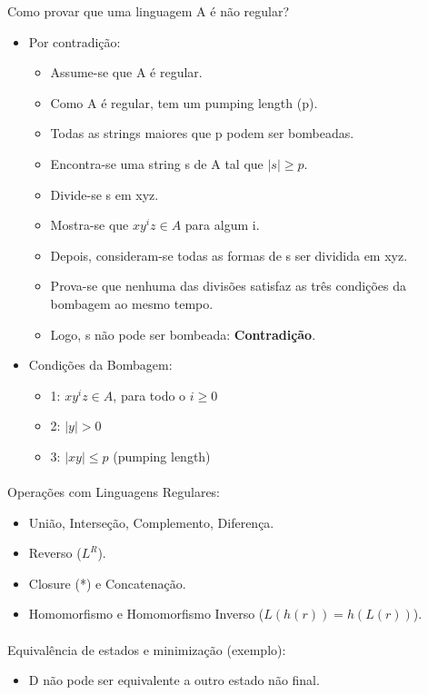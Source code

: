 \documentclass[../resumosTCOM.tex]{subfiles}
\begin{document}
Como provar que uma linguagem A é não regular?
\begin{itemize}
    \item Por contradição:
    \begin{itemize}
        \item Assume-se que A é regular.
        \item Como A é regular, tem um pumping length (p).
        \item Todas as strings maiores que p podem ser bombeadas.
        \item Encontra-se uma string s de A tal que \(|s| \geq p\).
        \item Divide-se s em xyz.
        \item Mostra-se que \(xy^iz \in A\) para algum i.
        \item Depois, consideram-se todas as formas de s ser dividida em xyz.
        \item Prova-se que nenhuma das divisões satisfaz as três condições da bombagem ao mesmo tempo.
        \item Logo, s não pode ser bombeada: \textbf{Contradição}.
    \end{itemize}
    \item Condições da Bombagem:
    \begin{itemize}
        \item 1: \(xy^iz \in A\), para todo o \(i \geq 0 \)
        \item 2: \(|y| > 0\)
        \item 3: \(|xy| \leq p\) (pumping length)
    \end{itemize}
\end{itemize}

\paragraph{}

Operações com Linguagens Regulares:
\begin{itemize}
    \item União, Interseção, Complemento, Diferença.
    \item Reverso (\(L^R\)).
    \item Closure (*) e Concatenação.
    \item Homomorfismo e Homomorfismo Inverso (\(L(h(r)) = h(L(r))\)).
\end{itemize}

\paragraph{}

Equivalência de estados e minimização (exemplo):
\begin{figure}[H]
    \centering
    \label{fig:nfa_state_min}%
\end{figure}
\begin{itemize}
    \item D não pode ser equivalente a outro estado não final.
\end{itemize}
\end{document}
